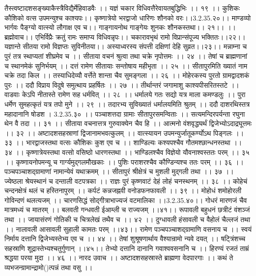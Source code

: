 तैस्त्वष्टादशसङ्ख्याकैस्त्रैविद्यैर्मेहिवाडवैः ।।
यज्ञं चकार विधिवत्तैरेवायतबुद्धिभिः ।। १९ ।।
कुशिकः कौशिको वत्स उपमन्युश्च काश्यपः।।
कृष्णात्रेयो भरद्वाजो धारिणः शौनको वरः।।3.2.35.२०।।
माण्डव्यो भार्गवः पैङ्ग्यो वात्स्यो लौगाक्ष एव च।।
गाङ्गायनोथ गाङ्गेयः शुनकः शौनकस्तथा।। २१।।
।।ब्रह्मोवाच।।
एभिर्विप्रैः क्रतुं रामः समाप्य विधिवन्नृपः।।
चकारावभृथं रामो विप्रान्संपूज्य भक्तितः।।२२।।
यज्ञान्ते सीतया रामो विज्ञप्तः सुविनीतया।।
अस्याध्वरस्य संपत्ती दक्षिणां देहि सुव्रत।।२३।।
मन्नाम्ना च पुरं तत्र स्थाप्यतां शीघ्रमेव च ।।
सीताया वचनं श्रुत्वा तथा चक्रे नृपोत्तमः ।। २४ ।।
तेषां च ब्राह्मणानां च स्थानमेकं सुनिर्भयम् ।।
दत्तं रामेण सीतायाः सन्तोषाय महीभृता ।। २५ ।।
सीतापुरमिति ख्यातं नाम चक्रे तदा किल ।।
तस्याधिदेव्यौ वर्त्तेते शान्ता चैव सुमङ्गला ।। २६ ।।
मोहेरकस्य पुरतो ग्रामद्वादशकं पुरः ।।
ददौ विप्राय विदुषे समुत्थाय प्रहर्षितः ।। २७ ।।
तीर्थान्तरं जगामाशु काश्यपीसरितस्तटे ।।
वाडवाः केऽपि नीतास्ते रामेण सह धर्मवित् ।। २८ ।।
धर्मालये गतः सद्यो यत्र माला कमण्डलुः ।।
पुरा धर्मेण सुमहत्कृतं यत्र तपो मुने ।। २९ ।।
तदारभ्य सुविख्यातं धर्मालयमिति
श्रुतम् ।। ददौ दाशरथिस्तत्र महादानानि षोडश । 3.2.35.३० ।।
पञ्चाशत्तदा ग्रामाः सीतापुरसमन्विताः ।।
सत्यमन्दिरपर्यन्ता रघुना थेन वै तदा ।। ३१ ।।
सीताया वचनात्तत्र गुरुवाक्येन चैव हि ।।
आत्मनो वंशवृद्ध्यर्थं द्विजेभ्योऽदाद्रघूत्तमः ।। ३२ ।।
अष्टादशसहस्राणां द्विजानामभवत्कुलम् ।।
वात्स्यायन उपमन्युर्जातूकर्ण्योऽथ पिङ्गलः ।। ३३ ।।
भारद्वाजस्तथा वत्सः कौशिकः कुश एव च ।।
शाण्डिल्यः कश्यपश्चैव गौतमश्छान्धनस्तथा ।। ३४ ।।
कृष्णात्रेयस्तथा वत्सो वसिष्ठो धारणस्तथा ।।
भाण्डिलश्चैव विज्ञेयो यौवनाश्वस्ततः परम् ।। ३५ ।।
कृष्णायनोपमन्यू च गार्ग्यमुद्गलमौखकाः ।।
पुशिः पराशरश्चैव कौण्डिन्यश्च ततः परम् ।। ३६ ।।
पञ्चपञ्चाशद्ग्रामाणां नामान्येवं यथाक्रमम् ।।
सीतापुरं श्रीक्षेत्रं च मुशली मुद्गली तथा ।। ३७ ।।
ज्येष्ठला श्रेयस्थानं च दन्ताली वटपत्रका ।।
राज्ञः पुरं कृष्णवाटं देहं लोहं चनस्थनम् ।। ३८ ।।
कोहेचं चन्दनक्षेत्रं थलं च हस्तिनापुरम् ।।
कर्पटं कन्नजह्नवी वनोडफनफावली ।। ३९ ।।
मोहोधं शमोहोरली गोविन्दणं थलत्यजम् ।।
चारणसिद्धं सोद्गीत्राभाज्यजं वटमालिका ।।3.2.35.४०।।
गोधरं मारणजं चैव मात्रमध्यं च मातरम् ।।
बलवती गन्धवती ईआम्ली च राज्यजम् ।।४१।।
रूपावली बहुधनं छत्रीटं वंशञ्जं तथा ।।
जायासंरणं गोतिकी च चित्रलेखं तथैव च ।। ४२ ।।
दुग्धावली हंसावली च वैहोलं चैल्लजं तथा ।।
नालावली आसावली सुहाली कामतः परम् ।।४३।।
रामेण पञ्चपञ्चाशद्ग्रामाणि वसनाय च ।।
स्वयं निर्माय दत्तानि द्विजेभ्यस्तेभ्य एव च ।। ४४ ।।
तेषां शुश्रूषणार्थाय वैश्यान्रामो न्यवे दयत् ।।
षट्त्रिंशच्च सहस्राणि शूद्रास्तेभ्यश्चतुर्गुणान् ।।४५।।
तेभ्यो दत्तानि दानानि गवाश्ववसनानि च ।।
हिरण्यं रजतं ताम्रं श्रद्धया परया मुदा ।। ४६ ।।
नारद उवाच ।।
अष्टादशसहस्रास्ते ब्राह्मणा वेदपारगाः ।।
कथं ते व्यभजन्ग्रामान्द्रामो()त्पन्नं तथा वसु ।।
